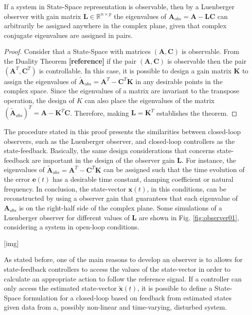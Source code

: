 \documentclass[a4paper,11pt]{book}
\numberwithin{figure}{chapter}
\numberwithin{equation}{chapter}
\numberwithin{table}{chapter}
\newtheorem{theorem}{Theorem}[chapter]
\theoremstyle{definition}
\newcounter{boxed-theorem}
\newenvironment{boxed-theorem}[1]
{\begin{shaded} \begin{theorem}{#1}}
{\end{theorem} \end{shaded}}
\newcounter{boxed-definition}
\begin{document}
\begin{boxed-theorem}
    If a system in State-Space representation is observable, then by a Luenberger observer with gain matrix $\bm{L} \in \mathbb{R}^{n \times p}$ the eigenvalues of $\bm{A}_{obs} = \bm{A} - \bm{L} \bm{C}$ can arbitrarily be assigned anywhere in the complex plane, given that complex conjugate eigenvalues are assigned in pairs.
\end{boxed-theorem} 

\begin{proof}
    Consider that a State-Space with matrices $(\bm{A}, \bm{C})$ is observable. From the Duality Theorem \textbf{[reference]} if the pair $(\bm{A}, \bm{C})$ is observable then the pair $(\bm{A}^T, \bm{C}^T)$ is controllable. In this case, it is possible to design     a gain matrix $\bm{K}$ to assign the eigenvalues of $\tilde{\bm{A}}_{obs} = \bm{A}^T - \bm{C}^T \bm{K}$ in any desirable points in the complex space. Since the eigenvalues of a matrix are invariant to the transpose operation, the design of $K$ can also place the eigenvalues of the matrix $(\tilde{\bm{A}}_{obs})^T = \bm{A} - \bm{K}^T \bm{C}$. Therefore, making $\bm{L} = \bm{K}^T$ establishes the theorem.
\end{proof}

The procedure stated in this proof presents the similarities between closed-loop observers, such as the Luenberger observer, and closed-loop controllers as the state-feedback. Basically, the same design considerations that concerns state-feedback are important in the design of the observer gain $\bm{L}$. For instance, the eigenvalues of $\tilde{\bm{A}}_{obs} = \bm{A}^T - \bm{C}^T \bm{K}$ can be assigned such that the time evolution of the error $\bm{e}(t)$ has a desirable time constant, damping coefficient or natural frequency. In conclusion, the state-vector $\bm{x}(t)$, in this conditions, can be reconstructed by using a observer gain that guarantees that each eigenvalue of $\bm{A}_{obs}$ is on the right-half side of the complex plane. Some simulations of a Luenberger observer for different values of $\bm{L}$ are shown in Fig. \ref{fig:observer01}, considering a system in open-loop conditions.

[img]

As stated before, one of the main reasons to develop an observer is to allows for state-feedback controllers to access the values of the state-vector in order to calculate an appropriate action to follow the reference signal. If a controller can only access the estimated state-vector $\tilde{\bm{x}}(t)$, it is possible to define a State-Space formulation for a closed-loop based on feedback from estimated states given data from a, possibly non-linear and time-varying, disturbed system.
\end{document}
